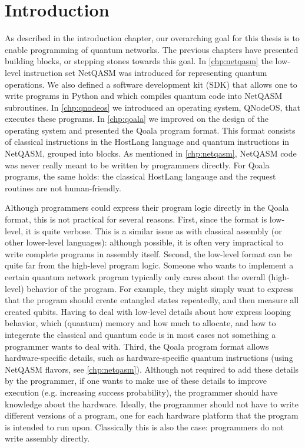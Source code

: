 \section{Introduction}
As described in the introduction chapter, our overarching goal for this thesis is to enable programming of quantum networks.
The previous chapters have presented building blocks, or stepping stones towards this goal.
In \cref{chp:netqasm} the low-level instruction set NetQASM was introduced for representing quantum operations.
We also defined a software development kit (SDK) that allows one to write programs in Python and which compiles quantum code into NetQASM subroutines.
In \cref{chp:qnodeos} we introduced an operating system, QNodeOS, that executes these programs.
In \cref{chp:qoala} we improved on the design of the operating system and presented the Qoala program format.
This format consists of classical instructions in the HostLang language and quantum instructions in NetQASM, grouped into blocks.
As mentioned in \cref{chp:netqasm}, NetQASM code was never really meant to be written by programmers directly.
For Qoala programs, the same holds: the classical HostLang langauge and the request routines are not human-friendly.

Although programmers could express their program logic directly in the Qoala format, this is not practical for several reasons.
First, since the format is low-level, it is quite verbose.
This is a similar issue as with classical assembly (or other lower-level languages): although possible, it is often very impractical to write complete programs in assembly itself.
Second, the low-level format can be quite far from the high-level program logic.
Someone who wants to implement a certain quantum network program typically only cares about the overall (high-level) behavior of the program.
For example, they might simply want to express that the program should create entangled states repeatedly, and then measure all created qubits.
Having to deal with low-level details about how express looping behavior, which (quantum) memory and how much to allocate, and how to integerate the classical and quantum code
is in most cases not something a programmer wants to deal with. 
Third, the Qoala program format allows hardware-specific details, such as hardware-specific quantum instructions (using NetQASM flavors, see \cref{chp:netqasm}).
Although not required to add these details by the programmer, if one wants to make use of these details to improve execution (e.g. increasing success probability), the programmer should have knowledge about the hardware.
Ideally, the programmer should not have to write different versions of a program, one for each hardware platform that the program is intended to run upon.
Classically this is also the case: programmers do not write assembly directly.

